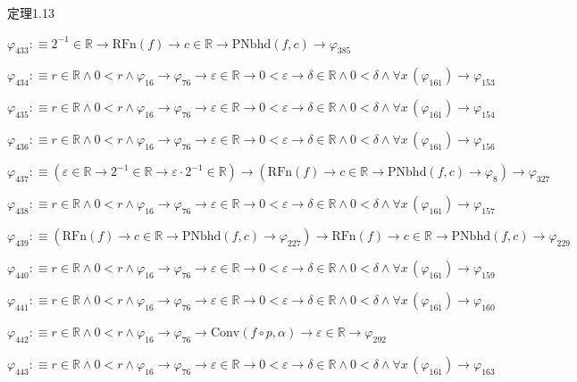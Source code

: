 \begin{fullproof}{定理1.13}
\begin{abbrevlist}
\item $\varphi_{433} :\equiv 2^{-1} \in \mathbb{R} \to \mathrm{RFn}(f) \to c \in \mathbb{R} \to \mathrm{PNbhd}(f,c) \to \varphi_{385}$
\item $\varphi_{434} :\equiv r \in \mathbb{R} \land 0 < r \land \varphi_{16} \to \varphi_{76} \to \varepsilon \in \mathbb{R} \to 0 < \varepsilon \to \delta \in \mathbb{R} \land 0 < \delta \land \forall x\,(\varphi_{161}) \to \varphi_{153}$
\item $\varphi_{435} :\equiv r \in \mathbb{R} \land 0 < r \land \varphi_{16} \to \varphi_{76} \to \varepsilon \in \mathbb{R} \to 0 < \varepsilon \to \delta \in \mathbb{R} \land 0 < \delta \land \forall x\,(\varphi_{161}) \to \varphi_{154}$
\item $\varphi_{436} :\equiv r \in \mathbb{R} \land 0 < r \land \varphi_{16} \to \varphi_{76} \to \varepsilon \in \mathbb{R} \to 0 < \varepsilon \to \delta \in \mathbb{R} \land 0 < \delta \land \forall x\,(\varphi_{161}) \to \varphi_{156}$
\item $\varphi_{437} :\equiv (\varepsilon \in \mathbb{R} \to 2^{-1} \in \mathbb{R} \to \varepsilon \cdot 2^{-1} \in \mathbb{R}) \to (\mathrm{RFn}(f) \to c \in \mathbb{R} \to \mathrm{PNbhd}(f,c) \to \varphi_{8}) \to \varphi_{327}$
\item $\varphi_{438} :\equiv r \in \mathbb{R} \land 0 < r \land \varphi_{16} \to \varphi_{76} \to \varepsilon \in \mathbb{R} \to 0 < \varepsilon \to \delta \in \mathbb{R} \land 0 < \delta \land \forall x\,(\varphi_{161}) \to \varphi_{157}$
\item $\varphi_{439} :\equiv (\mathrm{RFn}(f) \to c \in \mathbb{R} \to \mathrm{PNbhd}(f,c) \to \varphi_{227}) \to \mathrm{RFn}(f) \to c \in \mathbb{R} \to \mathrm{PNbhd}(f,c) \to \varphi_{229}$
\item $\varphi_{440} :\equiv r \in \mathbb{R} \land 0 < r \land \varphi_{16} \to \varphi_{76} \to \varepsilon \in \mathbb{R} \to 0 < \varepsilon \to \delta \in \mathbb{R} \land 0 < \delta \land \forall x\,(\varphi_{161}) \to \varphi_{159}$
\item $\varphi_{441} :\equiv r \in \mathbb{R} \land 0 < r \land \varphi_{16} \to \varphi_{76} \to \varepsilon \in \mathbb{R} \to 0 < \varepsilon \to \delta \in \mathbb{R} \land 0 < \delta \land \forall x\,(\varphi_{161}) \to \varphi_{160}$
\item $\varphi_{442} :\equiv r \in \mathbb{R} \land 0 < r \land \varphi_{16} \to \varphi_{76} \to \mathrm{Conv}(f \circ p,\alpha) \to \varepsilon \in \mathbb{R} \to \varphi_{292}$
\item $\varphi_{443} :\equiv r \in \mathbb{R} \land 0 < r \land \varphi_{16} \to \varphi_{76} \to \varepsilon \in \mathbb{R} \to 0 < \varepsilon \to \delta \in \mathbb{R} \land 0 < \delta \land \forall x\,(\varphi_{161}) \to \varphi_{163}$

\end{abbrevlist}
\end{fullproof}
